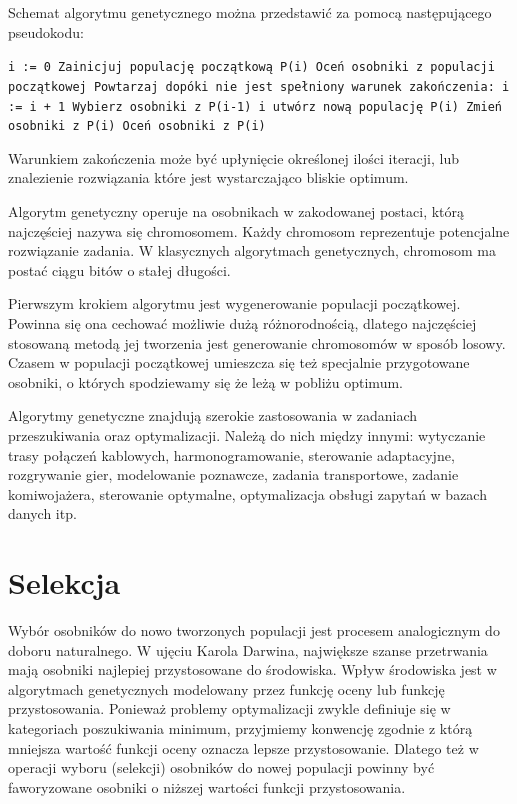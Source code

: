 \documentclass[brudnopis]{xmgr}
\begin{document}
Schemat algorytmu genetycznego można przedstawić za pomocą następującego pseudokodu:

\noindent
\texttt{i := 0\newline
Zainicjuj populację początkową P(i)\newline
Oceń osobniki z populacji początkowej\newline
Powtarzaj dopóki nie jest spełniony warunek zakończenia:\newline
\indent i := i + 1\newline
\indent Wybierz osobniki z P(i-1) i utwórz nową populację P(i)\newline
\indent Zmień osobniki z P(i)\newline
\indent Oceń osobniki z P(i)\newline
}

Warunkiem zakończenia może być upłynięcie określonej ilości iteracji, lub znalezienie rozwiązania które jest wystarczająco bliskie optimum.

Algorytm genetyczny operuje na osobnikach w zakodowanej postaci, którą najczęściej nazywa się chromosomem. Każdy chromosom reprezentuje potencjalne rozwiązanie zadania. W klasycznych algorytmach genetycznych, chromosom ma postać ciągu bitów o stałej długości.

Pierwszym krokiem algorytmu jest wygenerowanie populacji początkowej. Powinna się ona cechować możliwie dużą różnorodnością, dlatego najczęściej stosowaną metodą jej tworzenia jest generowanie chromosomów w sposób losowy. Czasem w populacji początkowej umieszcza się też specjalnie przygotowane osobniki, o których spodziewamy się że leżą w pobliżu optimum.

Algorytmy genetyczne znajdują szerokie zastosowania w zadaniach przeszukiwania oraz optymalizacji. Należą do nich między innymi: wytyczanie trasy połączeń kablowych, harmonogramowanie, sterowanie adaptacyjne, rozgrywanie gier, modelowanie poznawcze, zadania transportowe, zadanie komiwojażera, sterowanie optymalne, optymalizacja obsługi zapytań w bazach danych itp.\cite{Michalewicz:2003:AGSDPE}

\section{Selekcja}

Wybór osobników do nowo tworzonych populacji jest procesem analogicznym do doboru naturalnego. W ujęciu Karola Darwina, największe szanse przetrwania mają osobniki najlepiej przystosowane do środowiska. Wpływ środowiska jest w algorytmach genetycznych modelowany przez funkcję oceny lub funkcję przystosowania. Ponieważ problemy optymalizacji zwykle definiuje się w kategoriach poszukiwania minimum, przyjmiemy konwencję zgodnie z którą mniejsza wartość funkcji oceny oznacza lepsze przystosowanie. Dlatego też w operacji wyboru (selekcji) osobników do nowej populacji powinny być faworyzowane osobniki o niższej wartości funkcji przystosowania.
\end{document}
